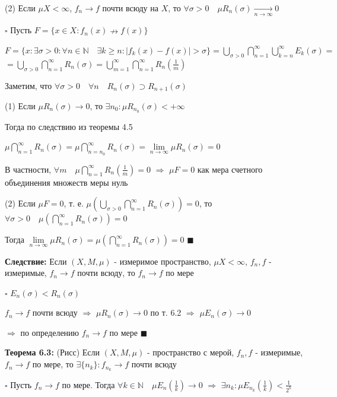 \documentclass[a4paper]{report}
\begin{document}
(2) Если $\mu X<\infty$, $f_n\to f$ почти всюду на $X$, то $\forall\sigma>0\quad\mu R_n(\sigma)\xrightarrow[n\to\infty]{}0$

\noindent $\square$ Пусть $F=\{x\in X\colon f_n(x)\nrightarrow f(x)\}$ 

$F=\{x\colon\exists\sigma>0\colon\forall n\in\mathbb N\quad\exists k\ge n\colon|f_k(x)-f(x)|>\sigma\}=\bigcup\limits_{\sigma>0}\bigcap\limits_{n=1}^\infty
\bigcup\limits_{k=n}^\infty E_k(\sigma)=$
$=\bigcup\limits_{\sigma>0}\bigcap\limits_{n=1}^\infty R_n(\sigma)=\bigcup\limits_{m=1}^\infty\bigcap\limits_{n=1}^\infty R_n(\frac1m)$

Заметим, что $\forall\sigma>0\quad\forall n\quad R_n(\sigma)\supset R_{n+1}(\sigma)$

\noindent (1) Если $\mu R_n(\sigma)\to0$, то $\exists n_0\colon\mu R_{n_0}(\sigma)<+\infty$

Тогда по следствию из теоремы 4.5

 $\mu\bigcap\limits_{n=1}^\infty R_n(\sigma)=\mu\bigcap\limits_{n=n_0}^\infty R_n(\sigma)=\lim\limits_{n\to\infty}\mu R_n(\sigma)=0$

В частности, $\forall m\quad\mu\bigcap\limits_{n=1}^\infty R_n(\frac1m)=0$ $\Rightarrow$ $\mu F=0$ как мера счетного объединения множеств меры нуль

\noindent (2) Если $\mu F=0$, т. е. $\mu\left(\bigcup\limits_{\sigma>0}\bigcap\limits_{n=1}^\infty R_n(\sigma)\right)=0$, то $\forall\sigma>0\quad\mu\left(\bigcap\limits_{n=1}^\infty R_n(\sigma)\right)=0$

Тогда $\lim\limits_{n\to\infty}\mu R_n(\sigma)=\mu\left(\bigcap\limits_{n=1}^\infty R_n(\sigma)\right)=0$ $\blacksquare$
\bigskip

\noindent\textbf{Следствие:} Если $(X,M,\mu)$ - измеримое пространство, $\mu X<\infty$, $f_n,f$ - измеримые, $f_n\to f$ почти всюду, то $f_n\to f$ по мере

\noindent $\square$ $E_n(\sigma)<R_n(\sigma)$

$f_n\to f$ почти всюду $\Rightarrow$ $\mu R_n(\sigma)\to0$ по т. 6.2 $\Rightarrow$ $\mu E_n(\sigma)\to0$ 

$\Rightarrow$ по определению $f_n\to f$ по мере $\blacksquare$
\bigskip

\noindent\textbf{Теорема 6.3:} (Рисс) Если $(X,M,\mu)$ - пространство с мерой, $f_n,f$ - измеримые, $f_n\to f$ по мере, то $\exists\{n_k\}\colon f_{n_k}\to f$ почти всюду

\noindent $\square$ Пусть $f_n\to f$ по мере. Тогда $\forall k\in\mathbb N\quad\mu E_n(\frac1k)\to0$ $\Rightarrow$ $\exists n_k\colon\mu E_{n_k}(\frac1k)<\displaystyle\frac{1}{2^k}$
\end{document}
